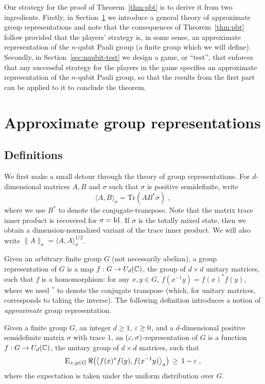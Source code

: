 Our strategy for the proof of Theorem~\ref{thm:pbt} is to derive it from two ingredients. Firstly, in Section~\ref{sec:approx-group} we introduce a general theory of approximate group representations and note that the consequences of Theorem~\ref{thm:pbt} follow provided that the players' strategy is, in some sense, an approximate representation of the $n$-qubit Pauli group (a finite group which we will define). Secondly, in Section~\ref{sec:nqubit-test} we design a game, or ``test'', that enforces that any successful strategy for the players in the game specifies an approximate representation of the $n$-qubit Pauli group, so that the results from the first part can be applied to it to conclude the theorem. 

\section{Approximate group representations}
\label{sec:approx-group}

\subsection{Definitions}

We first make a small detour through the theory of group representations. For $d$-dimensional matrices  $A,B$ and $\sigma$ such that $\sigma$ is positive semidefinite, write 
$$\langle A,B\rangle_\sigma = \mathrm{Tr}(AB^* \sigma)\;,$$
where we use $B^*$ to denote the conjugate-transpose. Note that the matrix trace inner product is recovered for $\sigma = \mathop{\rm Id}\nolimits$. If $\sigma$ is the totally mixed state, then we obtain a dimension-normalized variant of the trace inner product. We will also write $\|A\|_\sigma = \langle A,A\rangle_\sigma^{1/2}$. 

Given an arbitrary finite group $G$ (not necessarily abelian), a group representation of $G$ is a map $f:G \to U_d(\mathbb{C})$, the group of $d\times d$ unitary matrices, such that $f$ is a homomorphism: for any $x,y\in G$, $f(x^{-1}y)=f(x)^* f(y)$, where we used $^*$ to denote the conjugate transpose (which, for unitary matrices, corresponds to taking the inverse). The following definition introduces a notion of \emph{approximate} group representation.  

\begin{definition}\label{def:approx-rep}
Given a finite group $G$, an integer $d\geq 1$, $\varepsilon\geq 0$, and a $d$-dimensional positive semidefinite matrix $\sigma$ with trace $1$, an $(\varepsilon,\sigma)$-representation of $G$ is a function $f: G \to U_d(\mathbb{C})$, the unitary group of $d\times d$ matrices, such that 
\begin{equation}\label{eq:gh-condition}
\textsc{E}_{x,y\in G} \,\Re\big(\big\langle f(x)^*f(y) ,f(x^{-1}y) \big\rangle_\sigma\big) \,\geq\, 1-\varepsilon\;,
\end{equation} 
where the expectation is taken under the uniform distribution over $G$.
\end{definition}

